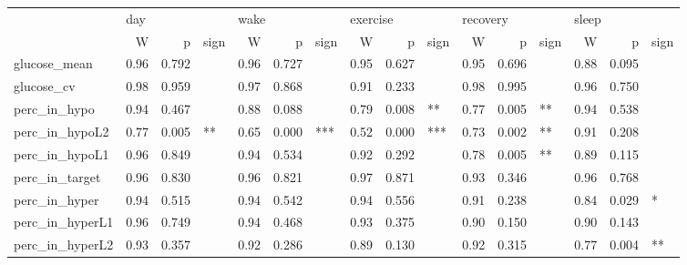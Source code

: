 \begin{tabular}{lrrlrrlrrlrrlrrl}
\toprule
{} & \multicolumn{3}{l}{day} & \multicolumn{3}{l}{wake} & \multicolumn{3}{l}{exercise} & \multicolumn{3}{l}{recovery} & \multicolumn{3}{l}{sleep} \\
{} &     W &      p & sign &     W &      p & sign &        W &      p & sign &        W &      p & sign &     W &      p & sign \\
\midrule
glucose_mean    &  0.96 &  0.792 &      &  0.96 &  0.727 &      &     0.95 &  0.627 &      &     0.95 &  0.696 &      &  0.88 &  0.095 &      \\
glucose_cv      &  0.98 &  0.959 &      &  0.97 &  0.868 &      &     0.91 &  0.233 &      &     0.98 &  0.995 &      &  0.96 &  0.750 &      \\
perc_in_hypo    &  0.94 &  0.467 &      &  0.88 &  0.088 &      &     0.79 &  0.008 &   ** &     0.77 &  0.005 &   ** &  0.94 &  0.538 &      \\
perc_in_hypoL2  &  0.77 &  0.005 &   ** &  0.65 &  0.000 &  *** &     0.52 &  0.000 &  *** &     0.73 &  0.002 &   ** &  0.91 &  0.208 &      \\
perc_in_hypoL1  &  0.96 &  0.849 &      &  0.94 &  0.534 &      &     0.92 &  0.292 &      &     0.78 &  0.005 &   ** &  0.89 &  0.115 &      \\
perc_in_target  &  0.96 &  0.830 &      &  0.96 &  0.821 &      &     0.97 &  0.871 &      &     0.93 &  0.346 &      &  0.96 &  0.768 &      \\
perc_in_hyper   &  0.94 &  0.515 &      &  0.94 &  0.542 &      &     0.94 &  0.556 &      &     0.91 &  0.238 &      &  0.84 &  0.029 &    * \\
perc_in_hyperL1 &  0.96 &  0.749 &      &  0.94 &  0.468 &      &     0.93 &  0.375 &      &     0.90 &  0.150 &      &  0.90 &  0.143 &      \\
perc_in_hyperL2 &  0.93 &  0.357 &      &  0.92 &  0.286 &      &     0.89 &  0.130 &      &     0.92 &  0.315 &      &  0.77 &  0.004 &   ** \\
\bottomrule
\end{tabular}
